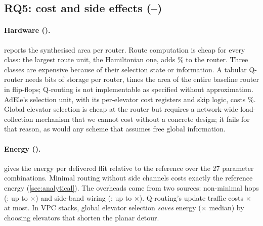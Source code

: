 \subsection{RQ5: cost and side effects (--)}
\label{sec:rq-cost}

\paragraph{Hardware ().}  reports the synthesised area per router. Route computation is cheap for every class: the largest route unit, the Hamiltonian one, adds \% to the router. Three classes are expensive because of their selection state or information. A tabular Q-router needs  bits of storage per router,  times the area of the entire baseline router in flip-flops; Q-routing is not implementable as specified without approximation. AdEle's selection unit, with its per-elevator cost registers and skip logic, costs \%. Global elevator selection is cheap at the router but requires a network-wide load-collection mechanism that we cannot cost without a concrete design; it fails  for that reason, as would any scheme that assumes free global information.

\begin{table}[tbp]
\centering
\caption{Hardware cost (), NanGate 45\,nm. Logic: seven route units plus shared selection logic. Storage: added state bits per router. Header: added bits per packet. Overhead relative to the two-VC baseline router (\,$\mu$m$^2$), including storage.}
\label{tab:d8}
\small

\end{table}

\paragraph{Energy ().}  gives the energy per delivered flit relative to the reference over the 27 parameter combinations. Minimal routing without side channels costs exactly the reference energy (\cref{sec:analytical}). The overheads come from two sources: non-minimal hops (: up to $\times$) and side-band wiring (: up to $\times$). Q-routing's update traffic costs $\times$ at most. In VPC stacks, global elevator selection \emph{saves} energy ($\times$ median) by choosing elevators that shorten the planar detour.


